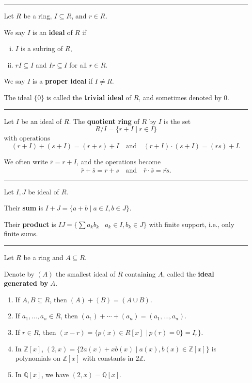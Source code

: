 \documentclass[12pt]{article}
\newcommand{\keyword}[1]{\textbf{#1}}
\newcommand{\sepline}{\rule{\textwidth}{0.4pt}}
\theoremstyle{definition}
\newcommand{\isp}[1]{\quad\text{#1}\quad}
\newcommand{\Z}{\mathbb{Z}}
\newcommand{\Q}{\mathbb{Q}}
\newcommand{\<}{\left\langle}
\renewcommand{\>}{\right\rangle}
\newcommand{\eqc}{\overline}
\begin{document}
\sepline

Let $R$ be a ring, $I \subseteq R$, and $r \in R$.

We say $I$ is an \keyword{ideal} of $R$ if
\begin{enumerate}[(i)]
    \item $I$ is a subring of $R$,
    \item $rI \subseteq I$ and $Ir \subseteq I$ for all $r \in R$.
\end{enumerate}

We say $I$ is a \keyword{proper ideal} if $I \ne R$.

The ideal $\{0\}$ is called the \keyword{trivial ideal} of $R$, and sometimes denoted by $0$.

\sepline

Let $I$ be an ideal of $R$. The \keyword{quotient ring} of $R$ by $I$ is the set
\[
    R/I = \{r + I \mid r \in I\}
\]
with operations
\[
    (r+I) + (s+I) = (r+s) + I \isp{and} (r+I) \cdot (s+I) = (rs) + I.
\]

We often write $\eqc{r} = r + I$, and the operations become
\[
    \eqc{r} + \eqc{s} = \eqc{r + s} \isp{and} \eqc{r} \cdot \eqc{s} = \eqc{rs}.
\]

\sepline

Let $I, J$ be ideal of $R$.

Their \keyword{sum} is $I+J = \{a+b \mid a \in I, b \in J\}$.

Their \keyword{product} is $IJ = \{\sum a_kb_k \mid a_k \in I, b_k \in J\}$ with finite support, i.e., only finite sums.

\sepline

Let $R$ be a ring and $A \subseteq R$.

Denote by $(A)$ the smallest ideal of $R$ containing $A$, called the \keyword{ideal generated by} $A$.

\begin{enumerate}
    \item If $A, B \subseteq R$, then $(A) + (B) = (A \cup B)$.
    
    \item If $a_1, \dots, a_n \in R$, then $(a_1) + \cdots + (a_n) = (a_1, \dots, a_n)$.
    
    \item If $r \in R$, then $(x - r) = \{p(x) \in R[x] \mid p(r) = 0\} = I_r\}$.
    
    \item In $\Z[x]$, $(2, x) = \{2a(x) + xb(x) \mid a(x), b(x) \in \Z[x]\}$ is polynomials on $\Z[x]$ with constants in $2\Z$.
    
    \item In $\Q[x]$, we have $(2, x) = \Q[x]$.
\end{enumerate}
\end{document}
